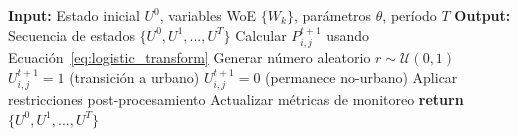 \begin{algorithm}[H]
\caption{Simulación AC-WoE con Decaimiento Exponencial}
\label{alg:ca_simulation}
\begin{algorithmic}
\STATE \textbf{Input:} Estado inicial $U^0$, variables WoE $\{W_k\}$, parámetros $\theta$, período $T$
\STATE \textbf{Output:} Secuencia de estados $\{U^0, U^1, ..., U^T\}$
\STATE 
{}
			\STATE Calcular $P_{i,j}^{t+1}$ usando Ecuación~\ref{eq:logistic_transform}
		\STATE Generar número aleatorio $r \sim \mathcal{U}(0,1)$
			\STATE $U_{i,j}^{t+1} = 1$ (transición a urbano)
		\ELSE
			\STATE $U_{i,j}^{t+1} = 0$ (permanece no-urbano)
		\ENDIF
	\ENDFOR
	\STATE Aplicar restricciones post-procesamiento
	\STATE Actualizar métricas de monitoreo
\ENDFOR
\STATE \textbf{return} $\{U^0, U^1, ..., U^T\}$
\end{algorithmic}
\end{algorithm}
